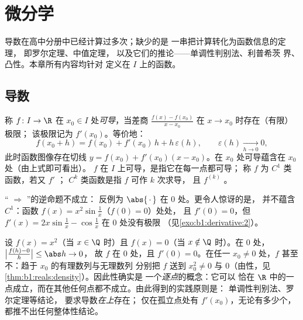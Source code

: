 \chapter{微分学}\label{ch:b1:derivative}

导数在高中分册中已经计算过多次；缺少的是
一串把计算转化为函数信息的定理，
即罗尔定理、中值定理，
以及它们的推论——单调性判别法、利普希茨 界、
凸性。本章所有内容均针对
定义在 $I$ 上的函数。

\section{导数}

\begin{definition}\label{def:b1:derivative:def}
称 $f \colon I \to \R$ 在 $x_0 \in
I$ 处\emph{可导}，当差商
$\frac{f(x) - f(x_0)}{x - x_0}$ 在 $x \to x_0$ 时存在（有限）极限；
该极限记为 $f'(x_0)$。等价地：
\[
f(x_0 + h) = f(x_0) + f'(x_0)\,h + h\,\varepsilon(h),
\qquad \varepsilon(h) \xrightarrow[h \to 0]{} 0 ,
\]
此时函数图像存在切线 $y = f(x_0) + f'(x_0)(x -
x_0)$。在 $x_0$ 处可导蕴含在 $x_0$ 处（由上式即可看出）。
$f$ 在 $I$ 上可导，是指它在每一点都可导；
称 $f$ 为 $C^1$ 类函数，若又 $f'$ ；
$C^k$ 类函数是指 $f$ 可作 $k$ 次求导，
且 $f^{(k)}$ 。
\end{definition}

\begin{example}\label{ex:b1:derivative:notc1}
“ $\Rightarrow$ ”的逆命题不成立：
反例为 $\abs{\,\cdot\,}$ 在 $0$ 处。更令人惊讶的是，
并不蕴含 $C^1$：函数 $f(x) = x^2 \sin\frac 1x$（$f(0) = 0$）处处，
且 $f'(0) = 0$，但 $f'(x) = 2x
\sin\frac1x - \cos\frac 1x$ 在 $0$ 处没有极限
（见\cref{exo:b1:derivative:2}）。
\end{example}

\begin{example}[恰在一点可导]\label{ex:b1:derivative:onepoint}
设 $f(x) = x^2$（当 $x \in \Q$ 时）且 $f(x) = 0$（当 $x \notin
\Q$ 时）。在 $0$ 处，$\bigl|\frac{f(h) - 0}{h}\bigr| \leq \abs h \to 0$，
故 $f$ 在 $0$ 处，且 $f'(0) = 0$。在任一 $x_0
\neq 0$ 处，$f$ 甚至不：趋于 $x_0$ 的有理数列与无理数列
分别把 $f$ 送到 $x_0^2 \neq 0$ 与
$0$（由性，见\cref{thm:b1:reals:density}）。因此性确实是
一个\emph{逐点}的概念：它可以
恰在 $\R$ 中的一点成立，而在其他任何点都不成立。由此得到的实践原则是：
单调性判别法、罗尔定理等结论，
要求导数\emph{在上}存在；
仅在孤立点处有 $f'(x_0)$，无论有多少个，
都推不出任何整体性结论。
\end{example}

